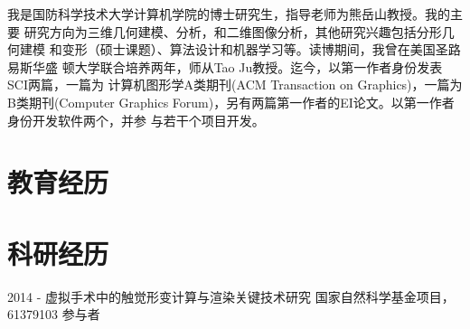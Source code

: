 \documentclass[20pt]{article} %
\begin{document}
\begin{flushleft}
我是国防科学技术大学计算机学院的博士研究生，指导老师为熊岳山教授。我的主要
研究方向为三维几何建模、分析，和二维图像分析，其他研究兴趣包括分形几何建模
和变形（硕士课题）、算法设计和机器学习等。读博期间，我曾在美国圣路易斯华盛
顿大学联合培养两年，师从Tao Ju教授。迄今，以第一作者身份发表SCI两篇，一篇为
计算机图形学A类期刊(ACM Transaction on Graphics)，一篇为B类期刊(Computer
Graphics Forum)，另有两篇第一作者的EI论文。以第一作者身份开发软件两个，并参
与若干个项目开发。
\end{flushleft}

\section{教育经历}



\section{科研经历}
\job
{2014 - }{}
{虚拟手术中的触觉形变计算与渲染关键技术研究}
{国家自然科学基金项目，61379103}
{参与者}
\end{document}
